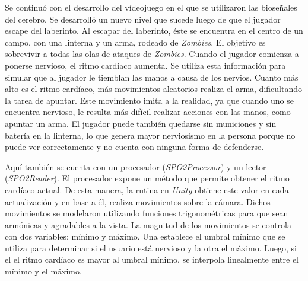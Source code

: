 Se continuó con el desarrollo del vídeojuego en el que se utilizaron las bioseñales del cerebro. Se desarrolló un nuevo nivel que sucede luego de que el jugador escape del laberinto. Al escapar del laberinto, éste se encuentra en el centro de un campo,  con una linterna y un arma, rodeado de \emph{Zombies}. El objetivo es sobrevivir a todas las olas de ataques de \emph{Zombies}. Cuando el jugador comienza a ponerse nervioso, el ritmo cardíaco aumenta. Se utiliza esta información para simular que al jugador le tiemblan las manos a causa de los nervios. Cuanto más alto es el ritmo cardíaco, más movimientos aleatorios realiza el arma, dificultando la tarea de apuntar. Este movimiento imita a la realidad, ya que cuando uno se encuentra nervioso, le resulta más difícil realizar acciones con las manos, como apuntar un arma. El jugador puede también quedarse sin municiones y sin batería en la linterna, lo que genera mayor nerviosismo en la persona porque no puede ver correctamente y no cuenta con ninguna forma de defenderse.

Aquí también se cuenta con un procesador (\emph{SPO2Processor}) y un lector (\emph{SPO2Reader}). El procesador expone un método que permite obtener el ritmo cardíaco actual. De esta manera, la rutina en \emph{Unity} obtiene este valor en cada actualización y en base a él, realiza movimientos sobre la cámara. Dichos movimientos se modelaron utilizando funciones trigonométricas para que sean armónicas y agradables a la vista. La magnitud de los movimientos se controla con dos variables: mínimo y máximo. Una establece el umbral mínimo que se utiliza para determinar si el usuario está nervioso y la otra el máximo. Luego, si el el ritmo cardíaco es mayor al umbral mínimo, se interpola linealmente entre el mínimo y el máximo.